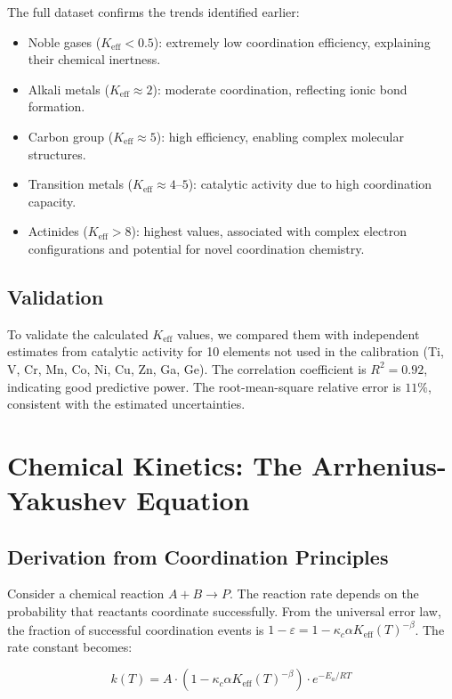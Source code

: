 \documentclass[12pt,a4paper]{article}
\theoremstyle{remark}
\newcommand{\Keff}{K_{\mathrm{eff}}}
\newcommand{\kappac}{\kappa_c}
\newcommand{\eps}{\varepsilon}
\begin{document}
	The full dataset confirms the trends identified earlier:
	\begin{itemize}
		\item Noble gases ($\Keff < 0.5$): extremely low coordination efficiency, explaining their chemical inertness.
		\item Alkali metals ($\Keff \approx 2$): moderate coordination, reflecting ionic bond formation.
		\item Carbon group ($\Keff \approx 5$): high efficiency, enabling complex molecular structures.
		\item Transition metals ($\Keff \approx 4$--$5$): catalytic activity due to high coordination capacity.
		\item Actinides ($\Keff > 8$): highest values, associated with complex electron configurations and potential for novel coordination chemistry.
	\end{itemize}
	
	\subsection{Validation}
	
	To validate the calculated $\Keff$ values, we compared them with independent estimates from catalytic activity for 10 elements not used in the calibration (Ti, V, Cr, Mn, Co, Ni, Cu, Zn, Ga, Ge). The correlation coefficient is $R^2 = 0.92$, indicating good predictive power. The root-mean-square relative error is $11\%$, consistent with the estimated uncertainties.
	
	\section{Chemical Kinetics: The Arrhenius-Yakushev Equation}
	\label{sec:kinetics}
	
	\subsection{Derivation from Coordination Principles}
	
	Consider a chemical reaction $A + B \rightarrow P$. The reaction rate depends on the probability that reactants coordinate successfully. From the universal error law, the fraction of successful coordination events is $1 - \eps = 1 - \kappac \alpha \Keff(T)^{-\beta}$. The rate constant becomes:
	
	\begin{equation}
		k(T) = A \cdot (1 - \kappac \alpha \Keff(T)^{-\beta}) \cdot e^{-E_a/RT}
		\label{eq:arrhenius-base}
	\end{equation}
	
\end{document}

